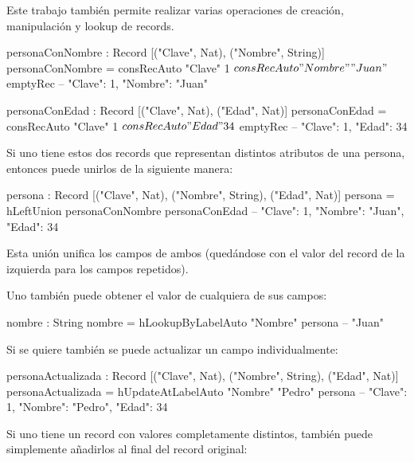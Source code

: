 Este trabajo también permite realizar varias operaciones de creación, manipulación y lookup de records.

\begin{code}
personaConNombre : Record [("Clave", Nat), ("Nombre", String)]
personaConNombre = consRecAuto "Clave" 1 $
  consRecAuto "Nombre" "Juan" $
  emptyRec
-- { "Clave": 1, "Nombre": "Juan" }

personaConEdad : Record [("Clave", Nat), ("Edad", Nat)]
personaConEdad = consRecAuto "Clave" 1 $
  consRecAuto "Edad" 34 $
  emptyRec
-- { "Clave": 1, "Edad": 34 }
\end{code}

Si uno tiene estos dos records que representan distintos atributos de una persona, entonces puede unirlos de la siguiente manera:

\begin{code}
persona : Record [("Clave", Nat), ("Nombre", String), 
  ("Edad", Nat)]
persona = hLeftUnion personaConNombre personaConEdad
-- { "Clave": 1, "Nombre": "Juan", "Edad": 34 }
\end{code}

Esta unión unifica los campos de ambos (quedándose con el valor del record de la izquierda para los campos repetidos).

Uno también puede obtener el valor de cualquiera de sus campos:

\begin{code}
nombre : String
nombre = hLookupByLabelAuto "Nombre" persona
-- "Juan"
\end{code}

Si se quiere también se puede actualizar un campo individualmente:

\begin{code}
personaActualizada : Record [("Clave", Nat), ("Nombre", String), 
  ("Edad", Nat)]
personaActualizada = hUpdateAtLabelAuto "Nombre" "Pedro" persona
-- { "Clave": 1, "Nombre": "Pedro", "Edad": 34 }
\end{code}

Si uno tiene un record con valores completamente distintos, también puede simplemente añadirlos al final del record original:


